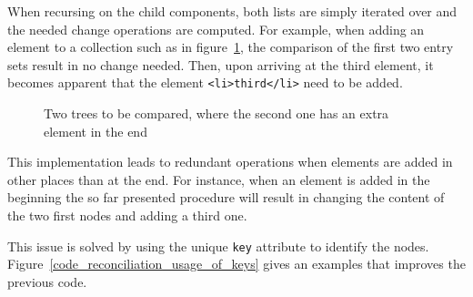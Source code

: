 When recursing on the child components, both lists are simply iterated
over and the needed change operations are computed. For example, when
adding an element to a collection such as in figure~\ref{code_reconciliation_extra_element}, the comparison
of the first two entry sets result in no change needed. Then, upon
arriving at the third element, it becomes apparent that the element
\texttt{\textless{}li\textgreater{}third\textless{}/li\textgreater{}}
need to be added.

\begin{figure}
\begin{Shaded}
\begin{Highlighting}[]

\end{Highlighting}
\end{Shaded}
\caption{Two trees to be compared, where the second one has an extra element in the end}
\label{code_reconciliation_extra_element}
\end{figure}


This implementation leads to redundant operations when elements are
added in other places than at the end. For instance, when an element is
added in the beginning the so far presented procedure will
result in changing the content of the two first nodes and adding a third
one.

This issue is solved by using the unique \texttt{key} attribute to
identify the nodes. Figure~\ref{code_reconciliation_usage_of_keys} gives an examples that improves the
previous code.

